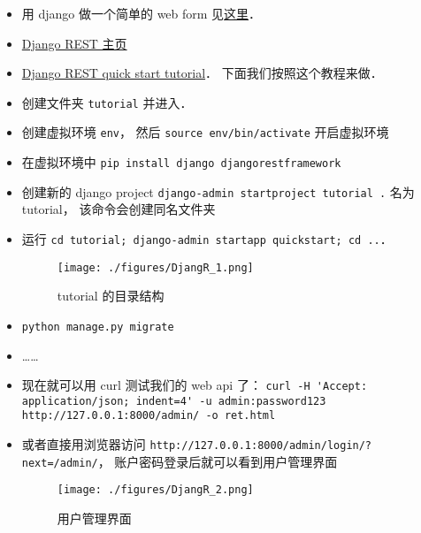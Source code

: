 
\begin{issues}
\issueDraft
\end{issues}

\begin{itemize}
\item 用 django 做一个简单的 web form 见\href{https://www.geeksforgeeks.org/how-to-create-a-form-using-django-forms/}{这里}．
\item \href{https://www.django-rest-framework.org/}{Django REST 主页}
\item \href{https://www.django-rest-framework.org/tutorial/quickstart/}{Django REST quick start tutorial}． 下面我们按照这个教程来做．
\item 创建文件夹 \verb|tutorial| 并进入．
\item 创建虚拟环境 \verb|env|， 然后 \verb|source env/bin/activate| 开启虚拟环境
\item 在虚拟环境中 \verb|pip install django djangorestframework|
\item 创建新的 django project \verb|django-admin startproject tutorial .| 名为 tutorial， 该命令会创建同名文件夹
\item 运行 \verb|cd tutorial; django-admin startapp quickstart; cd ..|．
\begin{figure}[ht]
\centering
\texttt{[image: ./figures/DjangR\_1.png]}
\caption{tutorial 的目录结构} \label{DjangR_fig1}
\end{figure}
\item \verb|python manage.py migrate|
\item ……
\item 现在就可以用 curl 测试我们的 web api 了： \verb|curl -H 'Accept: application/json; indent=4' -u admin:password123 http://127.0.0.1:8000/admin/ -o ret.html|
\item 或者直接用浏览器访问 \verb|http://127.0.0.1:8000/admin/login/?next=/admin/|， 账户密码登录后就可以看到用户管理界面
\begin{figure}[ht]
\centering
\texttt{[image: ./figures/DjangR\_2.png]}
\caption{用户管理界面} \label{DjangR_fig2}
\end{figure}
\end{itemize}
